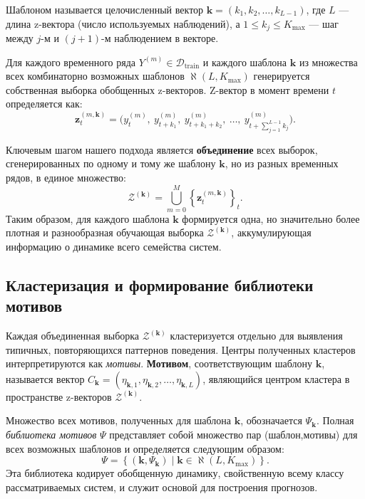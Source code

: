 \documentclass[a4paper,12pt]{extarticle}
\begin{document}
Шаблоном называется целочисленный вектор $\boldsymbol{k} = (k_1, k_2, \dots, k_{L-1})$,
 где $L$ — длина z-вектора (число используемых наблюдений), а $1 \le k_j \le K_{\max}$ — шаг между $j$-м и $(j+1)$-м наблюдением в векторе.

Для каждого временного ряда $Y^{(m)} \in \mathcal{D}_{\text{train}}$ и каждого шаблона
 $\boldsymbol{k}$ из множества всех комбинаторно возможных шаблонов $\aleph(L, K_{\max})$
  генерируется собственная выборка обобщенных z-векторов. Z-вектор в момент времени $t$ определяется как:
\[
\mathbf{z}_{t}^{(m, \boldsymbol{k})} = \bigl(y^{(m)}_t,\ y^{(m)}_{t+k_1},\ y^{(m)}_{t+k_1+k_2},\ \dots,\ y^{(m)}_{t + \sum_{j=1}^{L-1} k_j}\bigr).
\]


Ключевым шагом нашего подхода является \textbf{объединение} всех выборок, сгенерированных
 по одному и тому же шаблону $\boldsymbol{k}$, но из разных временных рядов, в единое множество:
\[
\mathcal{Z}^{(\boldsymbol{k})} = \bigcup_{m=0}^{M} \left\{ \mathbf{z}_{t}^{(m, \boldsymbol{k})} \right\}_{t}.
\]
Таким образом, для каждого шаблона $\boldsymbol{k}$ формируется одна, но значительно
 более плотная и разнообразная обучающая выборка $\mathcal{Z}^{(\boldsymbol{k})}$,
  аккумулирующая информацию о динамике всего семейства систем.

\subsection{Кластеризация и формирование библиотеки мотивов}

Каждая объединенная выборка $\mathcal{Z}^{(\boldsymbol{k})}$ кластеризуется отдельно
 для выявления типичных, повторяющихся паттернов поведения. Центры полученных кластеров
  интерпретируются как \textit{мотивы}.
\textbf{Мотивом}, соответствующим шаблону $\boldsymbol{k}$,
 называется вектор $C_{\boldsymbol{k}} = (\eta_{\boldsymbol{k},1},
 \eta_{\boldsymbol{k},2}, \dots, \eta_{\boldsymbol{k},L})$, являющийся
 центром кластера в пространстве z-векторов $\mathcal{Z}^{(\boldsymbol{k})}$.

Множество всех мотивов, полученных для шаблона $\boldsymbol{k}$,
обозначается $\Psi_{\boldsymbol{k}}$. Полная \textit{библиотека мотивов}
 $\Psi$ представляет собой множество пар (шаблон,мотивы) для всех возможных
  шаблонов и определяется следующим образом:
\[
\Psi = \left\{ (\boldsymbol{k}, \Psi_{\boldsymbol{k}}) \mid \boldsymbol{k}
\in \aleph(L, K_{\max}) \right\}.
\]
Эта библиотека кодирует обобщенную динамику, свойственную всему классу рассматриваемых
 систем, и служит основой для построения прогнозов.
\end{document}
